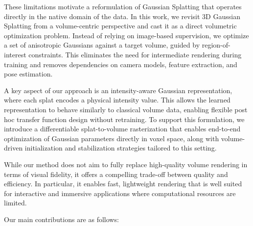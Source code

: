 \documentclass[runningheads]{llncs}
\begin{document}
These limitations motivate a reformulation of Gaussian Splatting that operates directly in the native domain of the data. In this work, we revisit 3D Gaussian Splatting from a volume-centric perspective and cast it as a direct volumetric optimization problem. Instead of relying on image-based supervision, we optimize a set of anisotropic Gaussians against a target volume, guided by region-of-interest constraints. This eliminates the need for intermediate rendering during training and removes dependencies on camera models, feature extraction, and pose estimation.

A key aspect of our approach is an intensity-aware Gaussian representation, where each splat encodes a physical intensity value. This allows the learned representation to behave similarly to classical volume data, enabling flexible post hoc transfer function design without retraining. To support this formulation, we introduce a differentiable splat-to-volume rasterization that enables end-to-end optimization of Gaussian parameters directly in voxel space, along with volume-driven initialization and stabilization strategies tailored to this setting.

While our method does not aim to fully replace high-quality volume rendering in terms of visual fidelity, it offers a compelling trade-off between quality and efficiency. In particular, it enables fast, lightweight rendering that is well suited for interactive and immersive applications where computational resources are limited.


Our main contributions are as follows:
\end{document}

